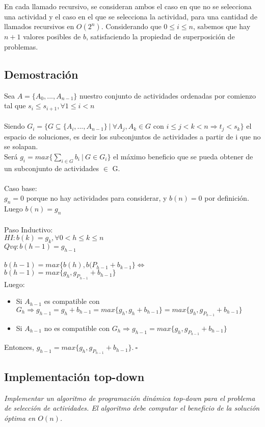 \documentclass[10pt, a4paper]{article}
\begin{document}
En cada llamado recursivo, se consideran ambos el caso en que no se selecciona una actividad y el caso en el que se selecciona la actividad, para una cantidad de llamados recursivos en $O(2^n)$. Considerando que $0 \leq i \leq n$, sabemos que hay $n+1$ valores posibles de $b$, satisfaciendo la propiedad de superposición de problemas.

\subsection{Demostración}
Sea $A = \{A_0, ... , A_{n-1}\}$ nuestro conjunto de actividades ordenadas por comienzo tal que $s_i \leq s_{i+1},  \forall  1 \leq i < n$ \\ \\
Siendo $G_i = \{G \subseteq \{ A_i, ..., A_{n-1} \} \ | \ \forall A_j, A_k \in G$ con $i \leq j < k < n \Rightarrow t_j < s_k\}$ el espacio de soluciones, es decir los subconjuntos de actividades a partir de i que no se solapan.
\\
Será $g_i = max \{ \sum_{i \in G } b_i \ | \ G \in G_i\}$ el máximo beneficio que se pueda obtener de un subconjunto de actividades $\in$ G. \\ \\
Caso base: \\ $g_n = 0$ porque no hay actividades para considerar, y $b(n) = 0$ por definición. Luego $b(n) = g_n$\\ \\
Paso Inductivo:\\
$HI: b(k) = g_k, \forall 0 < h \leq k \leq n$\\
$Qvq: b(h-1) = g_{h-1}$
\\ \\
$b(h-1) = max \{b(h), b(P_{h-1} + b_{k-1} \} \Leftrightarrow$
\\
$b(h-1) = max \{g_h, g_{P_{h-1}} + b_{h-1} \}$
\\ Luego:
\begin{itemize}
    \item Si $A_{h-1}$ es compatible con $G_h \Rightarrow g_{h-1} = g_h + b_{h-1} = max\{g_h, g_h + b_{h-1}\} = max\{g_h, g_{P_{h-1}} + b_{h-1}\}$
    \item Si $A_{h-1}$ no es compatible con $G_h \Rightarrow g_{h-1} = max\{g_h, g_{P_{h-1}} + b_{h-1}\}$
\end{itemize}

Entonces, $g_{h-1} = max\{g_h, g_{P_{h-1}} + b_{h-1}\}. \ \square$
\subsection{Implementación top-down}
\emph{Implementar un algoritmo de programación dinámica top-down para el problema de selección de actividades. El algoritmo debe computar el beneficio de la solución óptima en $O(n)$.} \\
\end{document}
